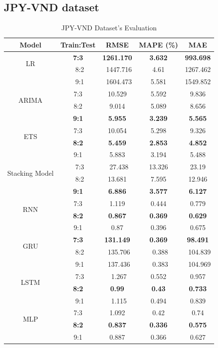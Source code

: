 \documentclass{ieeeojies}
\begin{document}
\subsection{JPY-VND dataset} 
\begin{table}[H]
    \centering
    \begin{tabular}{|c|c|c|c|c|}
         \hline
         \centering Model & Train:Test & RMSE & MAPE (\%) & MAE\\
         \hline
         \multirow{2}{*}{LR} &\textbf{7:3} &\textbf{1261.170		} &\textbf{3.632} &\textbf{993.698} \\ &\ 8:2 &\ 1447.716	&4.61	&1267.462 \\&\ 9:1 &\ 1604.473	&5.581	&1549.852 \\
         \hline
         \multirow{2}{*}{ARIMA} & 7:3 & 10.529 & 5.592 & 9.836 \\ & 8:2 & 9.014 & 5.089 & 8.656 \\& \textbf{9:1} & \textbf{5.955} & \textbf{3.239} & \textbf{5.565} \\
         \hline
         \multirow{2}{*}{ETS} & 7:3 & 10.054&5.298&9.326 \\ & \textbf{8:2} &\textbf{5.459}&\textbf{2.853} &\textbf{4.852} \\& 9:1 &5.883&3.194&5.488 \\
         \hline
         \multirow{2}{*}{Stacking Model} &\ 7:3 &\ 27.438	&13.326	&23.19 \\&\ 8:2 &13.681	&7.595&	12.946\\ & \textbf{9:1} &\textbf{6.886} &\textbf{3.577} &\textbf{6.127}\\
         \hline
         \multirow{2}{*}{RNN} & 7:3 & 1.119 & 0.444 & 0.779 \\ &\textbf{8:2} & \textbf{0.867} & \textbf{0.369} & \textbf{0.629} \\ & 9:1 & 0.87 & 0.396 & 0.675 \\
         \hline
         \multirow{2}{*}{GRU} &\textbf{7:3} &\textbf{131.149}&\textbf{0.369}&\textbf{98.491} \\ &\ 8:2 &\ 135.706&\ 0.388 &\ 104.839 \\&\ 9:1 &\ 137.436 &\ 0.383 &\ 104.969 \\
         \hline
         \multirow{2}{*}{LSTM} &\ 7:3 &\ 1.267	&0.552	&0.957  \\&\textbf{8:2}&\textbf{0.99} &\textbf{0.43} &\textbf{0.733} \\ &\ 9:1 &\ 1.115&	0.494&	0.839\\
         \hline
         \multirow{2}{*}{MLP} & 7:3 & 1.092 & 0.42 & 0.74 \\ &\textbf{8:2} & \textbf{0.837} & \textbf{0.336} & \textbf{0.575} \\ & 9:1 & 0.887 & 0.366 & 0.627 \\
         \hline
    \end{tabular}
    \caption{JPY-VND Dataset's Evaluation}
    \label{mbbresult}
\end{table}
\end{document}
